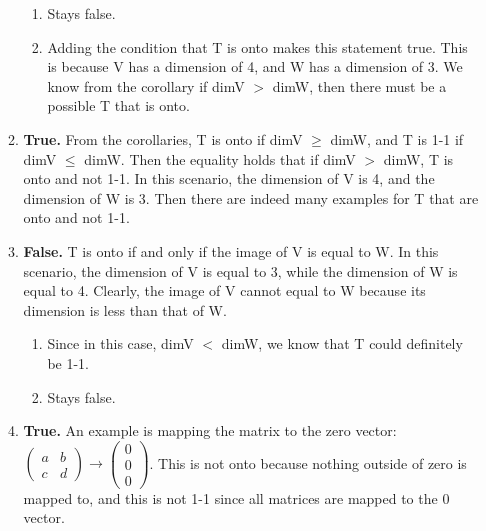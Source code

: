 \documentclass{article}
\begin{document}
\begin{enumerate}
\begin{enumerate}
\begin{enumerate}

\item Stays false.

\item Adding the condition that T is onto makes this statement true. This is because V has a dimension of 4, and W has a dimension of 3. We know from the corollary if dimV $>$ dimW, then there must be a possible T that is onto.

\end{enumerate}

\item \textbf{True.} From the corollaries, T is onto if dimV $\geq$ dimW, and T is 1-1 if dimV $\leq$ dimW. Then the equality holds that if dimV $>$ dimW, T is onto and not 1-1. In this scenario, the dimension of V is 4, and the dimension of W is 3. Then there are indeed many examples for T that are onto and not 1-1.

\item \textbf{False.} T is onto if and only if the image of V is equal to W. In this scenario, the dimension of V is equal to 3, while the dimension of W is equal to 4. Clearly, the image of V cannot equal to W because its dimension is less than that of W. 

\begin{enumerate}

\item Since in this case, dimV $<$ dimW, we know that T could definitely be 1-1.

\item Stays false.

\end{enumerate}

\item \textbf{True.} An example is mapping the matrix to the zero vector: $\left(\begin{array}{cc} a & b \\ c & d \end{array}\right) \rightarrow \left(\begin{array}{c} 0 \\ 0 \\ 0\end{array}\right)$. This is not onto because nothing outside of zero is mapped to, and this is not 1-1 since all matrices are mapped to the 0 vector.

\end{enumerate}

\end{enumerate}
\end{document}

